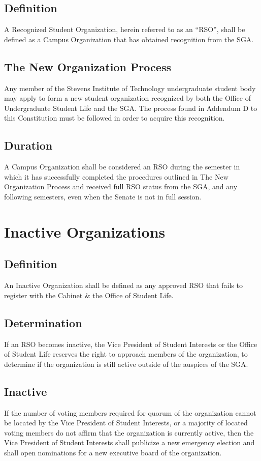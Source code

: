 \documentclass[12pt]{scrreprt}
\begin{document}
\subsection{Definition}
A Recognized Student Organization, herein referred to as an ``RSO'', shall be 
defined as a Campus Organization that has obtained recognition from the SGA.

\subsection{The New Organization Process}
Any member of the Stevens Institute of Technology undergraduate student
body may apply to form a new student organization recognized by both the Office of Undergraduate Student Life and the SGA. The process found in Addendum D to this Constitution must be followed in order to acquire this recognition.

\subsection{Duration}
A Campus Organization shall be considered an RSO during the semester in which
it has successfully completed the procedures outlined in The New Organization Process and received full RSO status from the SGA, and any following semesters, even when the Senate is not in full session.

\section{Inactive Organizations}

\subsection{Definition}
An Inactive Organization shall be defined as any approved RSO that fails to 
register with the Cabinet \& the Office of Student Life.

\subsection{Determination}
If an RSO becomes inactive, the Vice President of Student Interests or the Office of Student Life reserves the right to approach members of the organization, to determine if the 
organization is still active outside of the auspices of the SGA.

\subsection{Inactive}
If the number of voting members required for quorum of the organization cannot 
be located by the Vice President of Student Interests, or a majority of located voting members do not affirm that the organization is currently active, then the Vice President of Student Interests shall publicize a new emergency election and shall open nominations for a new executive board of the organization.
\end{document}
